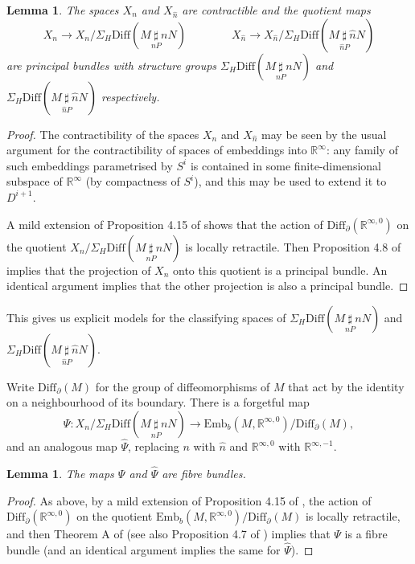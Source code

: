 \documentclass[reqno,a4paper]{article}
\numberwithin{equation}{section}
\theoremstyle{italicised}
\newtheorem{lem}[thm]{Lemma}
\theoremstyle{upright}
\theoremstyle{italicised-restate}
\newcommand{\bR}{\mathbb{R}}
\newcommand{\rinftyz}{\ensuremath{\bR^{\infty,0}}}
\newcommand{\rinftym}{\ensuremath{\bR^{\infty,-1}}}
\begin{document}
\begin{lem}\label{l:pbundle}
The spaces $X_n$ and $X_{\hat{n}}$ are contractible and the quotient maps
\[
X_n \longrightarrow X_n / \Sigma_H \mathrm{Diff}(M \underset{nP}{\sharp} nN) \qquad\qquad X_{\hat{n}} \longrightarrow X_{\hat{n}} / \Sigma_H \mathrm{Diff}(M \underset{\hat{n}P}{\sharp} \hat{n}N)
\]
are principal bundles with structure groups $\Sigma_H \mathrm{Diff}(M \underset{nP}{\sharp} nN)$ and $\Sigma_H \mathrm{Diff}(M \underset{\hat{n}P}{\sharp} \hat{n}N)$ respectively.
\end{lem}
\begin{proof}
The contractibility of the spaces $X_n$ and $X_{\hat{n}}$ may be seen by the usual argument for the contractibility of spaces of embeddings into $\bR^\infty$: any family of such embeddings parametrised by $S^i$ is contained in some finite-dimensional subspace of $\bR^\infty$ (by compactness of $S^i$), and this may be used to extend it to $D^{i+1}$.

A mild extension of Proposition 4.15 of \cite{Palmer2018HomologicalstabilitymoduliI} shows that the action of $\mathrm{Diff}_\partial(\rinftyz)$ on the quotient $X_n / \Sigma_H \mathrm{Diff}(M \underset{nP}{\sharp} nN)$ is locally retractile. Then Proposition 4.8 of \cite{Palmer2018HomologicalstabilitymoduliI} implies that the projection of $X_n$ onto this quotient is a principal bundle. An identical argument implies that the other projection is also a principal bundle.
\end{proof}

This gives us explicit models for the classifying spaces of $\Sigma_H \mathrm{Diff}(M \underset{nP}{\sharp} nN)$ and $\Sigma_H \mathrm{Diff}(M \underset{\hat{n}P}{\sharp} \hat{n}N)$.

Write $\mathrm{Diff}_\partial(M)$ for the group of diffeomorphisms of $M$ that act by the identity on a neighbourhood of its boundary. There is a forgetful map
\begin{equation}\label{eq:main-fibre-bundle}
\Psi \colon X_n / \Sigma_H \mathrm{Diff}(M \underset{nP}{\sharp} nN) \longrightarrow \mathrm{Emb}_b(M,\rinftyz) / \mathrm{Diff}_\partial(M),
\end{equation}
and an analogous map $\hat{\Psi}$, replacing $n$ with $\hat{n}$ and $\rinftyz$ with $\rinftym$.

\begin{lem}\label{l:bundlepsi}
The maps $\Psi$ and $\hat{\Psi}$ are fibre bundles.
\end{lem}
\begin{proof}
As above, by a mild extension of Proposition 4.15 of \cite{Palmer2018HomologicalstabilitymoduliI}, the action of $\mathrm{Diff}_\partial(\rinftyz)$ on the quotient $\mathrm{Emb}_b(M,\rinftyz)/\mathrm{Diff}_\partial(M)$ is locally retractile, and then Theorem A of \cite{Palais1960Localtrivialityof} (see also Proposition 4.7 of \cite{Palmer2018HomologicalstabilitymoduliI}) implies that $\Psi$ is a fibre bundle (and an identical argument implies the same for $\hat{\Psi}$).
\end{proof}
\end{document}
